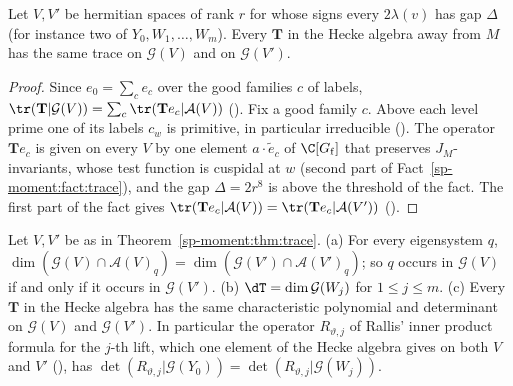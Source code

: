 \begin{theorem}\label{sp-moment:thm:trace}
Let $V,V'$ be hermitian spaces of rank $r$ for whose signs every $2\lambda(v)$ has gap $\Delta$ (for
instance two of $Y_0,W_1,\dots,W_m$). Every $\mathbf T$ in the Hecke algebra away from $M$ has the same
trace on $\mathcal G(V)$ and on $\mathcal G(V')$.
\end{theorem}

\begin{proof}
Since $e_0=\sum_ce_c$ over the good families $c$ of labels, $\tr(\mathbf T|\mathcal G(V))=\sum_c
\tr(\mathbf Te_c|\mathcal A(V))$ (). Fix a good family $c$. Above
each level prime one of its labels $c_w$ is primitive, in particular irreducible
(). The operator $\mathbf Te_c$ is given on every $V$ by one
element $a\cdot\tilde e_c$ of $\C[G_{\mathrm f}]$ that preserves $J_M$-invariants, whose test function is
cuspidal at $w$ (second part of Fact~\ref{sp-moment:fact:trace}), and the gap $\Delta=2r^8$ is
above the threshold of the fact. The first part of the fact gives
$\tr(\mathbf Te_c|\mathcal A(V))=\tr(\mathbf Te_c|\mathcal A(V'))$ ().
\end{proof}

\begin{corollary}
\label{sp-moment:cor:mult}
Let $V,V'$ be as in Theorem~\ref{sp-moment:thm:trace}.
(a) For every eigensystem $q$, $\dim(\mathcal G(V)\cap\mathcal A(V)_q)=\dim(\mathcal G(V')\cap
\mathcal A(V')_q)$; so $q$ occurs in $\mathcal G(V)$ if and only if it occurs in $\mathcal G(V')$.
(b) $\dT=\dim\mathcal G(W_j)$ for $1\le j\le m$.
(c) Every $\mathbf T$ in the Hecke algebra has the same characteristic polynomial and determinant on
$\mathcal G(V)$ and $\mathcal G(V')$. In particular the operator $R_{\vartheta,j}$ of Rallis'
inner product formula for the $j$-th lift, which one element of the Hecke algebra gives on both
$V$ and $V'$ (), has
$\det(R_{\vartheta,j}|\mathcal G(Y_0))=\det(R_{\vartheta,j}|\mathcal G(W_j))$.
\end{corollary}

